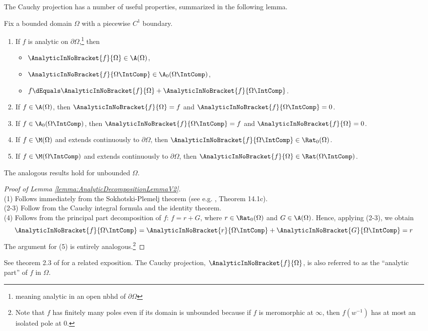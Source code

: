 \documentclass{article}
\numberwithin{equation}{section}
\begin{document}
The Cauchy projection has a number of useful properties, summarized in the following lemma.
\begin{lemma}\label{lemma:AnalyticDecompositionLemmaV2}
Fix a bounded domain $\Omega$ with a piecewise $C^1$ boundary.
    \begin{enumerate}
        \item If $f$ is analytic on $\partial\Omega$,\footnote{meaning analytic in an open nbhd of $\partial\Omega$} then
        \begin{itemize}
            \item $\AnalyticInNoBracket{f}{\Omega}\in\A(\Omega)$,
            \item $\AnalyticInNoBracket{f}{\Omega\IntComp}\in\A_0(\Omega\IntComp)$,
            \item $f\dEquals\AnalyticInNoBracket{f}{\Omega}+\AnalyticInNoBracket{f}{\Omega\IntComp}$.
        \end{itemize}
        \item If $f\in\A(\Omega)$, then $\AnalyticInNoBracket{f}{\Omega}=f$ and $\AnalyticInNoBracket{f}{\Omega\IntComp}=0$.
        \item If $f\in\A_0(\Omega\IntComp)$, then $\AnalyticInNoBracket{f}{\Omega\IntComp}=f$ and $\AnalyticInNoBracket{f}{\Omega}=0$.
        \item If $f\in\M(\Omega)$ and extends continuously to $\partial\Omega$, then $\AnalyticInNoBracket{f}{\Omega\IntComp}\in\Rat_0(\Omega)$.
        \item If $f\in\M(\Omega\IntComp)$ and extends continuously to $\partial\Omega$, then $\AnalyticInNoBracket{f}{\Omega}\in\Rat(\Omega\IntComp)$.
    \end{enumerate}
    The analogous results hold for unbounded $\Omega$.
\end{lemma}
\begin{proof}[Proof of Lemma \ref{lemma:AnalyticDecompositionLemmaV2}]\;\\
(1) Follows immediately from the Sokhotski-Plemelj theorem (see e.g. \cite{Henrici1986}, Theorem 14.1c).\\
(2-3) Follow from the Cauchy integral formula and the identity theorem.\\
(4) Follows from the principal part decomposition of $f$: $f=r+G$, where $r\in\Rat_0(\Omega)$ and $G\in\A(\Omega)$. Hence, applying (2-3), we obtain
$$\AnalyticInNoBracket{f}{\Omega\IntComp}=\AnalyticInNoBracket{r}{\Omega\IntComp}+\AnalyticInNoBracket{G}{\Omega\IntComp}=r$$
The argument for (5) is entirely analogous.\footnote{Note that $f$ has finitely many poles even if its domain is unbounded because if $f$ is meromorphic at $\infty$, then $f(w^{-1})$ has at most an isolated pole at $0$.}
\end{proof}
See theorem 2.3 of \cite{lenells2014matrixriemannhilbertproblemsjumps} for a related exposition. The Cauchy projection, $\AnalyticInNoBracket{f}{\Omega}$, is also referred to as the ``analytic part'' of $f$ in $\Omega$.\\
\end{document}
